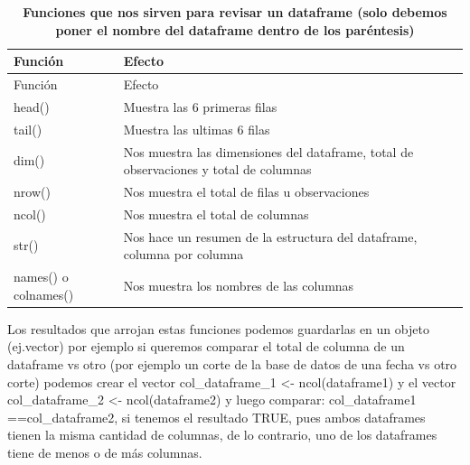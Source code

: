 \documentclass[
  letterpaper,
  DIV=11,
  numbers=noendperiod]{scrreprt}
\begin{document}
\begin{longtable}[]{@{}
  >{\raggedright\arraybackslash}p{}
  >{\raggedright\arraybackslash}p{}@{}}
\caption{\textbf{Funciones que nos sirven para revisar un dataframe
(solo debemos poner el nombre del dataframe dentro de los
paréntesis)}}\tabularnewline
\toprule\noalign{}
\begin{minipage}[b]{\linewidth}\raggedright
Función
\end{minipage} & \begin{minipage}[b]{\linewidth}\raggedright
Efecto
\end{minipage} \\
\midrule\noalign{}
\endfirsthead
\toprule\noalign{}
\begin{minipage}[b]{\linewidth}\raggedright
Función
\end{minipage} & \begin{minipage}[b]{\linewidth}\raggedright
Efecto
\end{minipage} \\
\midrule\noalign{}
\endhead
\bottomrule\noalign{}
\endlastfoot
head() & Muestra las 6 primeras filas \\
tail() & Muestra las ultimas 6 filas \\
dim() & Nos muestra las dimensiones del dataframe, total de
observaciones y total de columnas \\
nrow() & Nos muestra el total de filas u observaciones \\
ncol() & Nos muestra el total de columnas \\
str() & Nos hace un resumen de la estructura del dataframe, columna por
columna \\
names() o colnames() & Nos muestra los nombres de las columnas \\
\end{longtable}

Los resultados que arrojan estas funciones podemos guardarlas en un
objeto (ej.vector) por ejemplo si queremos comparar el total de columna
de un dataframe vs otro (por ejemplo un corte de la base de datos de una
fecha vs otro corte) podemos crear el vector col\_dataframe\_1
\textless- ncol(dataframe1) y el vector col\_dataframe\_2 \textless-
ncol(dataframe2) y luego comparar: col\_dataframe1 ==col\_dataframe2, si
tenemos el resultado TRUE, pues ambos dataframes tienen la misma
cantidad de columnas, de lo contrario, uno de los dataframes tiene de
menos o de más columnas.
\end{document}
